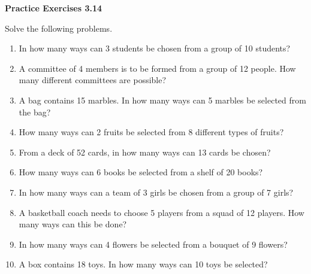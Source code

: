\vspace{0.3ex}
\noindent\textbf{Practice Exercises 3.14}

\vspace{0.2ex}

Solve the following problems.

\begin{enumerate}[label=\color{blue}\arabic*.]
    \item In how many ways can 3 students be chosen from a group of 10 students?
    \item A committee of 4 members is to be formed from a group of 12 people. How many different committees are possible?
    \item A bag contains 15 marbles. In how many ways can 5 marbles be selected from the bag?
    \item How many ways can 2 fruits be selected from 8 different types of fruits?
    \item From a deck of 52 cards, in how many ways can 13 cards be chosen?
    \item How many ways can 6 books be selected from a shelf of 20 books?
    \item In how many ways can a team of 3 girls be chosen from a group of 7 girls?
    \item A basketball coach needs to choose 5 players from a squad of 12 players. How many ways can this be done?
    \item In how many ways can 4 flowers be selected from a bouquet of 9 flowers?
    \item A box contains 18 toys. In how many ways can 10 toys be selected?
\end{enumerate}
